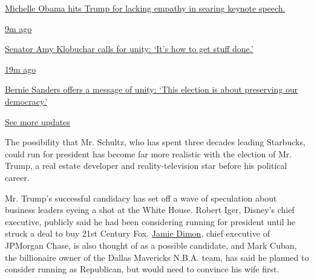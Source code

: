\href{https://www.nytimes3xbfgragh.onion/live/2020/08/17/us/dnc-convention?action=click\&pgtype=Article\&state=default\&region=MAIN_CONTENT_1\&context=storylines_live_updates\#michelle-obama-hits-trump-for-lacking-empathy-in-searing-keynote-speech}{Michelle
Obama hits Trump for lacking empathy in searing keynote speech.}

\href{https://www.nytimes3xbfgragh.onion/live/2020/08/17/us/dnc-convention?action=click\&pgtype=Article\&state=default\&region=MAIN_CONTENT_1\&context=storylines_live_updates\#senator-amy-klobuchar-calls-for-unity-its-how-to-get-stuff-done}{9m
ago}

\href{https://www.nytimes3xbfgragh.onion/live/2020/08/17/us/dnc-convention?action=click\&pgtype=Article\&state=default\&region=MAIN_CONTENT_1\&context=storylines_live_updates\#senator-amy-klobuchar-calls-for-unity-its-how-to-get-stuff-done}{Senator
Amy Klobuchar calls for unity: `It's how to get stuff done.'}

\href{https://www.nytimes3xbfgragh.onion/live/2020/08/17/us/dnc-convention?action=click\&pgtype=Article\&state=default\&region=MAIN_CONTENT_1\&context=storylines_live_updates\#bernie-sanders-offers-a-message-of-unity-this-election-is-about-preserving-our-democracy}{19m
ago}

\href{https://www.nytimes3xbfgragh.onion/live/2020/08/17/us/dnc-convention?action=click\&pgtype=Article\&state=default\&region=MAIN_CONTENT_1\&context=storylines_live_updates\#bernie-sanders-offers-a-message-of-unity-this-election-is-about-preserving-our-democracy}{Bernie
Sanders offers a message of unity: `This election is about preserving
our democracy.'}

\href{https://www.nytimes3xbfgragh.onion/live/2020/08/17/us/dnc-convention?action=click\&pgtype=Article\&state=default\&region=MAIN_CONTENT_1\&context=storylines_live_updates}{See
more updates}

The possibility that Mr. Schultz, who has spent three decades leading
Starbucks, could run for president has become far more realistic with
the election of Mr. Trump, a real estate developer and
reality-television star before his political career.

Mr. Trump's successful candidacy has set off a wave of speculation about
business leaders eyeing a shot at the White House. Robert Iger, Disney's
chief executive, publicly said he had been considering running for
president until he struck a deal to buy 21st Century Fox.
\href{https://www.nytimes3xbfgragh.onion/2018/04/05/business/dealbook/facebook-mark-zuckerberg-privacy.html}{Jamie
Dimon}, chief executive of JPMorgan Chase, is also thought of as a
possible candidate, and Mark Cuban, the billionaire owner of the Dallas
Mavericks N.B.A. team, has said he planned to consider running as
Republican, but would need to convince his wife first.

